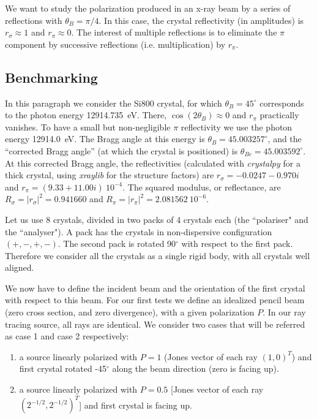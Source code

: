 \documentclass{iucr}
\begin{document}
We want to study the polarization produced in an x-ray beam by a series of reflections with $\theta_B=\pi/4$. In this case, the crystal reflectivity (in amplitudes) is $r_\sigma \approx 1$ and $r_\pi \approx 0$. The interest of multiple reflections is to eliminate the $\pi$ component by successive reflections (i.e. multiplication) by $r_\pi$.

\subsection{Benchmarking}

In this paragraph we consider the Si800 crystal, for which $\theta_B=45^{\circ}$ corresponds to the photon energy 12914.735~eV. There, $\cos(2\theta_B)\approx 0$ and $r_\pi$ practically vanishes. To have a small but non-negligible $\pi$ reflectivity we use the photon energy 12914.0~eV. The Bragg angle at this energy is $\theta_B=45.003257^{\circ}$, and the ``corrected Bragg angle'' (at which the crystal is positioned) is $\theta_{Bc}=45.003592^{\circ}$.
At this corrected Bragg angle, the reflectivities (calculated with {\it crystalpy} for a thick crystal, using {\it xraylib} for the structure factors) are $r_\sigma=-0.0247-0.970 i$ and $r_\pi=(9.33+11.00 i)~10^{-4}$.
The squared modulus, or reflectance, are $R_\sigma=|r_\sigma|^2=0.941660$ and
$R_\pi=|r_\pi|^2=2.081562~10^{-6}$.

Let us use 8 crystals, divided in two packs of 4 crystals each (the ``polariser" and the ``analyser"). A pack has the crystals in non-dispersive configuration $(+,-,+,-)$. The second pack is rotated 90$^\circ$ with respect to the first pack. Therefore we consider all the crystals as a single rigid body, with all crystals well aligned.

We now have to define the incident beam and the orientation of the first crystal with respect to this beam. For our first tests we define an idealized pencil beam (zero cross section, and zero divergence), with a given polarization $P$. In our ray tracing source, all rays are identical. We consider two cases that will be referred as case 1 and case 2 respectively:
\begin{enumerate}
    \item a source linearly polarized with $P=1$ (Jones vector of each ray $(1,0)^T$) and first crystal rotated -45$^\circ$ along the beam direction (zero is facing up).
    \item a source linearly polarized with $P=0.5$ [Jones vector of each ray $(2^{-1/2},2^{-1/2})^T$] and first crystal is facing up.    
\end{enumerate}
\end{document}
